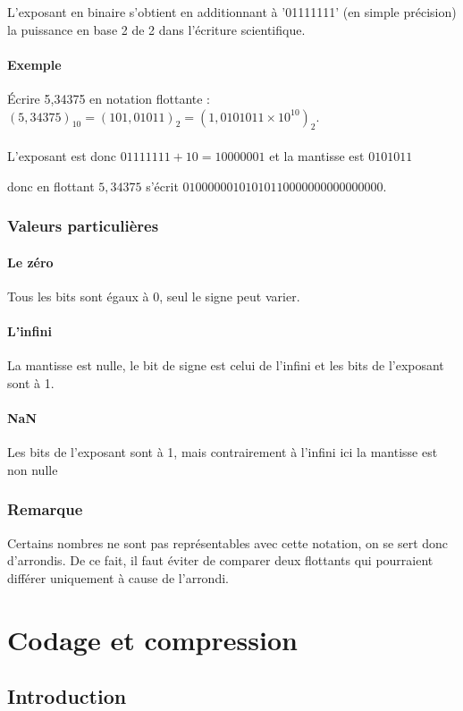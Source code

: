 \documentclass[a4paper,10pt]{book}
\begin{document}
L'exposant en binaire s'obtient en additionnant à '01111111' (en simple précision) la puissance en base 2 de 2 dans l'écriture scientifique.

\subsubsection{Exemple}
Écrire 5,34375 en notation flottante :\\

$(5,34375)_{10}=(101,01011)_{2}=(1,0101011\times 10^{10})_{2}$.\\\\
L'exposant est donc $01111111+10=10000001$ et la mantisse est $0101011$

donc en flottant $5,34375$ s'écrit $01000000101010110000000000000000$.

\subsection{Valeurs particulières}
\subsubsection{Le zéro}
Tous les bits sont égaux à 0, seul le signe peut varier.

\subsubsection{L'infini}
La mantisse est nulle, le bit de signe est celui de l'infini et les bits de l'exposant sont à 1.

\subsubsection{NaN}
Les bits de l'exposant sont à 1, mais contrairement à l'infini ici la mantisse est non nulle

\subsection{Remarque}
Certains nombres ne sont pas représentables avec cette notation, on se sert donc d'arrondis. De ce fait, il faut éviter de comparer deux flottants qui pourraient différer uniquement à cause de l'arrondi.

\chapter{Codage et compression}
\section{Introduction}
\end{document}
